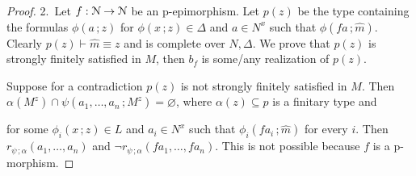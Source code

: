 \begin{proof}

  
  




  2.\ 
  Let $f: \EuScript N\to \EuScript N$ be an p-epimorphism.
  Let $p(z)$ be the type containing the formulas $\phi(a\,;z)$ for $\phi(x\,;z)\in\Delta$ and $a\in N^x$ such that $\phi(f\!a\,;\hat m)$.
  Clearly $p(z)\vdash\hat m\equiv z$ and is complete over $N,\Delta$.
  We prove that $p(z)$ is strongly finitely satisfied in $M$, then $b_f$ is some/any realization of $p(z)$.

  Suppose for a contradiction $p(z)$ is not strongly finitely satisfied in $M$. Then $\alpha(M^z)\cap\psi(a_1,\dots,a_n\,;M^z)=\varnothing$, where $\alpha(z)\subseteq p$ is a finitary type and 
  
  
  for some $\phi_i(x\,;z)\in L$ and $a_i\in N^x$ such that $\phi_i(f\!a_i\,;\hat m)$ for every $i$.
  Then $r_{\psi\,;\alpha}(a_1,\dots,a_n)$ and $\neg r_{\psi\,;\alpha}(f\!a_1,\dots,f\!a_n)$.
  This is not possible because $f$ is a p-morphism.






\end{proof}
